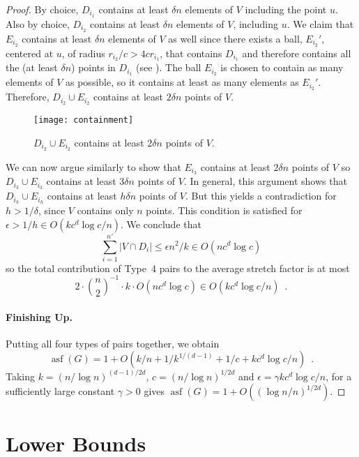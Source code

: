 \documentclass{patmorin}
\DeclareMathOperator{\asf}{asf}
\begin{document}
\begin{proof}
  By choice, $D_{i_1}$ contains at least $\delta n$ elements of $V$
  including the point $u$.  Also by choice, $D_{i_2}$ contains at least
  $\delta n$ elements of $V$, including $u$.  We claim that $E_{i_2}$
  contains at least $\delta n$ elements of $V$ as well since there
  exists a ball, $E_{i_2}'$, centered at $u$, of radius $r_{i_2}/c >
  4cr_{i_1}$, that contains $D_{i_1}$ and therefore contains all the
  (at least $\delta n$) points in $D_{i_1}$ (see ).
  The ball $E_{i_2}$ is chosen to contain as many elements of $V$ as
  possible, so it contains at least as many elements as $E_{i_2}'$.
  Therefore, $D_{i_2}\cup E_{i_2}$ contains at least $2\delta n$
  points of $V$.

  \begin{figure}
     \begin{center}
       \texttt{[image: containment]}
     \end{center}
     \caption{$D_{i_2}\cup E_{i_2}$ contains at least $2\delta n$ 
              points of $V$.}
   \end{figure}

  We can now argue similarly to show that $E_{i_3}$ contains at least
  $2\delta n$ points of $V$ so $D_{i_3}\cup E_{i_3}$ contains at least
  $3\delta n$ points of $V$.  In general, this argument shows that
  $D_{i_h}\cup E_{i_h}$ contains at least $h\delta n$ points of $V$.
  But this yields a contradiction for $h> 1/\delta$, since $V$ contains
  only $n$ points.  This condition is satisfied for $\epsilon > 1/h \in
  O(kc^d\log c/n)$. We conclude that
  \[
    \sum_{i=1}^{n'}|V\cap D_i| 
       \le \epsilon n^2/k  \in O(nc^d\log c)
  \]
  so the total contribution of Type~4 pairs to the average stretch factor
  is at most
  \[
    2\cdot\binom{n}{2}^{-1}\cdot k\cdot O(nc^d\log c) \in O(kc^d\log c/n) \enspace .
  \]

  \paragraph{Finishing Up.}
  Putting all four types of pairs together, we obtain
  \[
     \asf(G) = 1 + O(k/n + 1/k^{1/(d-1)} + 1/c + kc^d\log c/n) \enspace .
  \]
  Taking $k=(n/\log n)^{(d-1)/2d}$, $c=(n/\log n)^{1/2d}$ and $\epsilon
  = \gamma kc^d\log c/n$, for a sufficiently large constant $\gamma >0$
  gives $\asf(G)=1+O((\log n/n)^{1/2d})$.
\end{proof}



\section{Lower Bounds}
\end{document}
